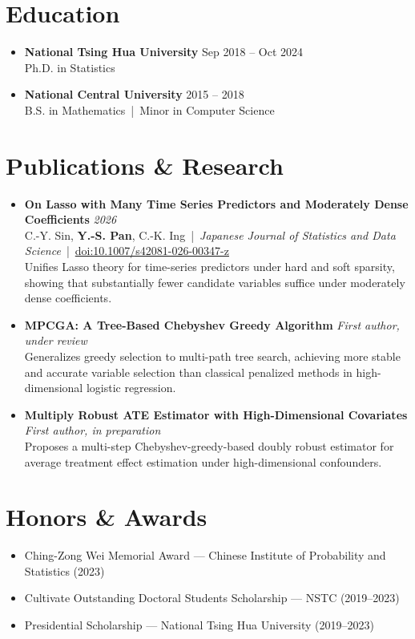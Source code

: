 \documentclass[letterpaper,11pt]{article}
\newcommand{\resumeItem}[1]{\item #1}
\newcommand{\resumeSubHeadingListStart}{\begin{itemize}[leftmargin=0.18in, label={}]}
\newcommand{\resumeSubHeadingListEnd}{\end{itemize}}
\begin{document}

\section{Education}
\resumeSubHeadingListStart
    \resumeItem{\textbf{National Tsing Hua University} \hfill Sep 2018 -- Oct 2024 \\
    Ph.D. in Statistics}

    \resumeItem{\textbf{National Central University} \hfill 2015 -- 2018 \\
    B.S. in Mathematics \,|\, Minor in Computer Science}
\resumeSubHeadingListEnd



\section{Publications \& Research}

\resumeSubHeadingListStart
\resumeItem{\textbf{On Lasso with Many Time Series Predictors and Moderately Dense Coefficients} \hfill \textit{2026} \\
C.-Y. Sin, \textbf{Y.-S. Pan}, C.-K. Ing \,|\, \textit{Japanese Journal of Statistics and Data Science} \,|\, \href{https://doi.org/10.1007/s42081-026-00347-z}{doi:10.1007/s42081-026-00347-z} \\
Unifies Lasso theory for time-series predictors under hard and soft sparsity, showing that substantially fewer candidate variables suffice under moderately dense coefficients.}

\resumeItem{\textbf{MPCGA: A Tree-Based Chebyshev Greedy Algorithm} \hfill \textit{First author, under review} \\
Generalizes greedy selection to multi-path tree search, achieving more stable and accurate variable selection than classical penalized methods in high-dimensional logistic regression.}

\resumeItem{\textbf{Multiply Robust ATE Estimator with High-Dimensional Covariates} \hfill \textit{First author, in preparation} \\
Proposes a multi-step Chebyshev-greedy-based doubly robust estimator for average treatment effect estimation under high-dimensional confounders.}
\resumeSubHeadingListEnd



\section{Honors \& Awards}
\resumeSubHeadingListStart
    \resumeItem{Ching-Zong Wei Memorial Award --- Chinese Institute of Probability and Statistics (2023)}
    \resumeItem{Cultivate Outstanding Doctoral Students Scholarship --- NSTC (2019--2023)}
    \resumeItem{Presidential Scholarship --- National Tsing Hua University (2019--2023)}
\resumeSubHeadingListEnd
\end{document}
